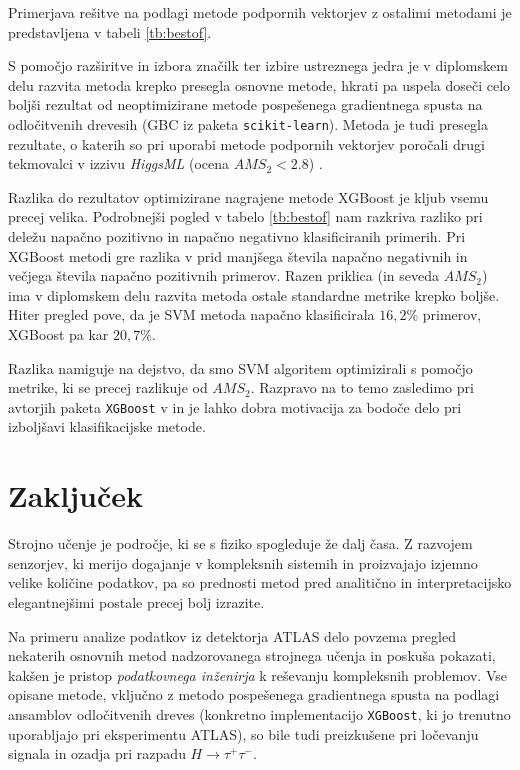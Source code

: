 \documentclass[11pt,a4paper,openany]{book}
\begin{document}
Primerjava rešitve na podlagi metode podpornih vektorjev z ostalimi metodami je predstavljena v tabeli \ref{tb:bestof}.

S pomočjo razširitve in izbora značilk ter izbire ustreznega jedra je v diplomskem delu razvita metoda krepko presegla osnovne metode, hkrati pa uspela doseči celo boljši rezultat od neoptimizirane metode pospešenega gradientnega spusta na odločitvenih drevesih (GBC iz paketa \texttt{scikit-learn}). Metoda je tudi presegla rezultate, o katerih so pri uporabi metode podpornih vektorjev poročali drugi tekmovalci v izzivu \textit{HiggsML} (ocena $AMS_2 < \num{2,8}$) \cite{KaggleSVM}.

Razlika do rezultatov optimizirane nagrajene metode XGBoost je kljub vsemu precej velika. Podrobnejši pogled v tabelo \ref{tb:bestof} nam razkriva razliko pri deležu napačno pozitivno in napačno negativno klasificiranih primerih. Pri XGBoost metodi gre razlika v prid manjšega števila napačno negativnih in večjega števila napačno pozitivnih primerov. Razen priklica (in seveda $AMS_2$) ima v diplomskem delu razvita metoda ostale standardne metrike krepko boljše. Hiter pregled pove, da je SVM metoda napačno klasificirala $16,2\%$ primerov, XGBoost pa kar $20,7\%$. 

Razlika namiguje na dejstvo, da smo SVM algoritem optimizirali s pomočjo metrike, ki se precej razlikuje od $AMS_2$. Razpravo na to temo zasledimo pri avtorjih paketa \texttt{XGBoost} v \cite{chen2014} in je lahko dobra motivacija za bodoče delo pri izboljšavi klasifikacijske metode.

\chapter*{Zaključek}

Strojno učenje je področje, ki se s fiziko spogleduje že dalj časa. Z razvojem senzorjev, ki merijo dogajanje v kompleksnih sistemih in proizvajajo izjemno velike količine podatkov, pa so prednosti metod pred analitično in interpretacijsko elegantnejšimi postale precej bolj izrazite. 

Na primeru analize podatkov iz detektorja ATLAS delo povzema pregled nekaterih osnovnih metod nadzorovanega strojnega učenja in poskuša pokazati, kakšen je pristop \textit{podatkovnega inženirja} k reševanju kompleksnih problemov. Vse opisane metode, vključno z metodo pospešenega gradientnega spusta na podlagi ansamblov odločitvenih dreves (konkretno implementacijo \texttt{XGBoost}, ki jo trenutno uporabljajo pri eksperimentu ATLAS), so bile tudi preizkušene pri ločevanju signala in ozadja pri razpadu $H \rightarrow \tau^+\tau^-$.
\end{document}
